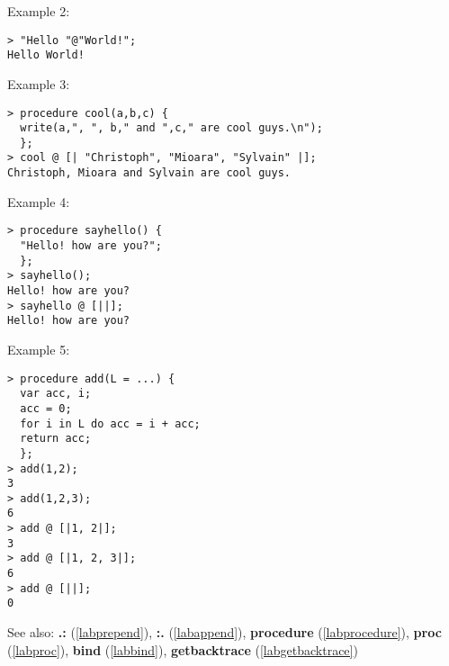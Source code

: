 \noindent Example 2: 
\begin{center}\begin{minipage}{15cm}\begin{Verbatim}[frame=single]
> "Hello "@"World!";
Hello World!
\end{Verbatim}
\end{minipage}\end{center}
\noindent Example 3: 
\begin{center}\begin{minipage}{15cm}\begin{Verbatim}[frame=single]
> procedure cool(a,b,c) { 
  write(a,", ", b," and ",c," are cool guys.\n");
  };
> cool @ [| "Christoph", "Mioara", "Sylvain" |];
Christoph, Mioara and Sylvain are cool guys.
\end{Verbatim}
\end{minipage}\end{center}
\noindent Example 4: 
\begin{center}\begin{minipage}{15cm}\begin{Verbatim}[frame=single]
> procedure sayhello() { 
  "Hello! how are you?";
  };
> sayhello();
Hello! how are you?
> sayhello @ [||];
Hello! how are you?
\end{Verbatim}
\end{minipage}\end{center}
\noindent Example 5: 
\begin{center}\begin{minipage}{15cm}\begin{Verbatim}[frame=single]
> procedure add(L = ...) {
  var acc, i;
  acc = 0;
  for i in L do acc = i + acc;
  return acc;
  };
> add(1,2);
3
> add(1,2,3);
6
> add @ [|1, 2|];
3
> add @ [|1, 2, 3|];
6
> add @ [||];
0
\end{Verbatim}
\end{minipage}\end{center}
See also: \textbf{.:} (\ref{labprepend}), \textbf{:.} (\ref{labappend}), \textbf{procedure} (\ref{labprocedure}), \textbf{proc} (\ref{labproc}), \textbf{bind} (\ref{labbind}), \textbf{getbacktrace} (\ref{labgetbacktrace})
